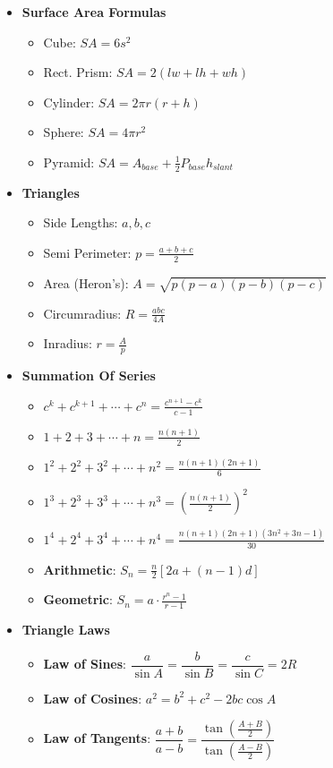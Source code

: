 \begin{itemize}
    \item \textbf{Surface Area Formulas}
          \begin{itemize}
              \item Cube: $SA = 6s^2$
              \item Rect. Prism: $SA = 2(lw+lh+wh)$
              \item Cylinder: $SA = 2\pi r(r+h)$
              \item Sphere: $SA = 4\pi r^2$
              \item Pyramid: $SA = A_{base} + \frac{1}{2}P_{base}h_{slant}$
          \end{itemize}

    \item \textbf{Triangles}
          \begin{itemize}
              \item Side Lengths: $a, b, c$
              \item Semi Perimeter: $p = \frac{a+b+c}{2}$
              \item Area (Heron's): $A = \sqrt{p(p-a)(p-b)(p-c)}$
              \item Circumradius: $R = \frac{abc}{4A}$
              \item Inradius: $r = \frac{A}{p}$
          \end{itemize}

    \item \textbf{Summation Of Series}
          \begin{itemize}
              \item $c^k + c^{k+1} + \cdots + c^n = \frac{c^{n+1} - c^k}{c-1}$
              \item $1+2+3+\cdots+n=\frac{n(n+1)}{2}$
              \item $1^2+2^2+3^2+\cdots+n^2=\frac{n(n+1)(2n+1)}{6}$
              \item $1^3+2^3+3^3+\cdots+n^3=\left(\frac{n(n+1)}{2}\right)^2$
              \item $1^4+2^4+3^4+\cdots+n^4=\frac{n(n+1)(2n+1)(3n^2+3n-1)}{30}$
              \item \textbf{Arithmetic}: $S_n = \frac{n}{2} \left[2a + (n-1)d\right]$
              \item \textbf{Geometric}: $S_n = a \cdot \frac{r^n - 1}{r - 1}$
          \end{itemize}

    \item \textbf{Triangle Laws}
          \begin{itemize}
              \item \textbf{Law of Sines}: $\dfrac{a}{\sin A} = \dfrac{b}{\sin B} = \dfrac{c}{\sin C} = 2R$
              \item \textbf{Law of Cosines}: $a^2 = b^2 + c^2 - 2bc \cos A$
              \item \textbf{Law of Tangents}: $\dfrac{a + b}{a - b} = \dfrac{\tan\left(\frac{A + B}{2}\right)}{\tan\left(\frac{A - B}{2}\right)}$
          \end{itemize}


\end{itemize}
